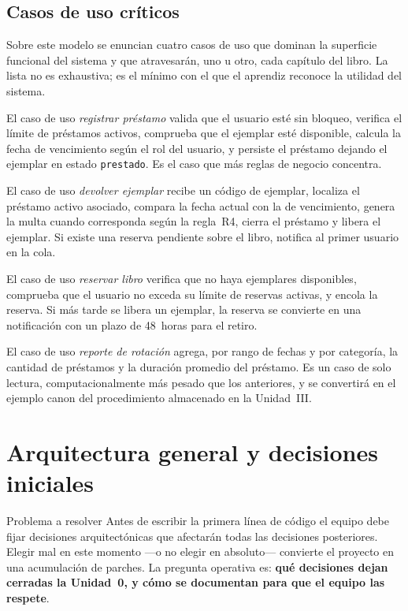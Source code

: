\subsection{Casos de uso cr\'iticos}
\label{sec:u0:modelo:casos}

Sobre este modelo se enuncian cuatro casos de uso que dominan la superficie funcional del sistema y que atravesar\'an, uno u otro, cada cap\'itulo del libro. La lista no es exhaustiva; es el m\'inimo con el que el aprendiz reconoce la utilidad del sistema.

El caso de uso \textit{registrar pr\'estamo} valida que el usuario est\'e sin bloqueo, verifica el l\'imite de pr\'estamos activos, comprueba que el ejemplar est\'e disponible, calcula la fecha de vencimiento seg\'un el rol del usuario, y persiste el pr\'estamo dejando el ejemplar en estado \texttt{prestado}. Es el caso que m\'as reglas de negocio concentra.

El caso de uso \textit{devolver ejemplar} recibe un c\'odigo de ejemplar, localiza el pr\'estamo activo asociado, compara la fecha actual con la de vencimiento, genera la multa cuando corresponda seg\'un la regla~R4, cierra el pr\'estamo y libera el ejemplar. Si existe una reserva pendiente sobre el libro, notifica al primer usuario en la cola.

El caso de uso \textit{reservar libro} verifica que no haya ejemplares disponibles, comprueba que el usuario no exceda su l\'imite de reservas activas, y encola la reserva. Si m\'as tarde se libera un ejemplar, la reserva se convierte en una notificaci\'on con un plazo de 48~horas para el retiro.

El caso de uso \textit{reporte de rotaci\'on} agrega, por rango de fechas y por categor\'ia, la cantidad de pr\'estamos y la duraci\'on promedio del pr\'estamo. Es un caso de solo lectura, computacionalmente m\'as pesado que los anteriores, y se convertir\'a en el ejemplo canon del procedimiento almacenado en la Unidad~III.

\section{Arquitectura general y decisiones iniciales}
\label{sec:u0:arq}

\begin{cajaproblema}{Problema a resolver}
Antes de escribir la primera l\'inea de c\'odigo el equipo debe fijar decisiones arquitect\'onicas que afectar\'an todas las decisiones posteriores. Elegir mal en este momento ---o no elegir en absoluto--- convierte el proyecto en una acumulaci\'on de parches. La pregunta operativa es: \textbf{qu\'e decisiones dejan cerradas la Unidad~0, y c\'omo se documentan para que el equipo las respete}.\par
\end{cajaproblema}

